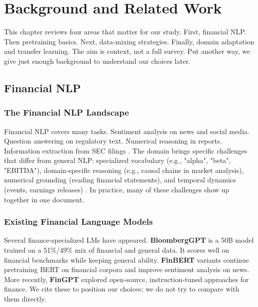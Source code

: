 \chapter{Background and Related Work}

This chapter reviews four areas that matter for our study. First, financial NLP. Then pretraining basics. Next, data-mixing strategies. Finally, domain adaptation and transfer learning. The aim is context, not a full survey. Put another way, we give just enough background to understand our choices later.

\section{Financial NLP}

\subsection{The Financial NLP Landscape}

Financial NLP covers many tasks. Sentiment analysis on news and social media. Question answering on regulatory text. Numerical reasoning in reports. Information extraction from SEC filings \parencite{araci2019finbert, chen2021finqa}. The domain brings specific challenges that differ from general NLP: specialized vocabulary (e.g., "alpha", "beta", "EBITDA"), domain‑specific reasoning (e.g., causal chains in market analysis), numerical grounding (reading financial statements), and temporal dynamics (events, earnings releases) \parencite{wu2023bloomberggpt, araci2019finbert}. In practice, many of these challenges show up together in one document.

\subsection{Existing Financial Language Models}

Several finance‑specialized LMs have appeared. \textbf{BloombergGPT} \parencite{wu2023bloomberggpt} is a 50B model trained on a 51\%/49\% mix of financial and general data. It scores well on financial benchmarks while keeping general ability. \textbf{FinBERT} variants \parencite{araci2019finbert, yang2020finbert} continue pretraining BERT on financial corpora and improve sentiment analysis on news. More recently, \textbf{FinGPT} \parencite{yang2023fingpt} explored open‑source, instruction‑tuned approaches for finance. We cite these to position our choices; we do not try to compare with them directly.

